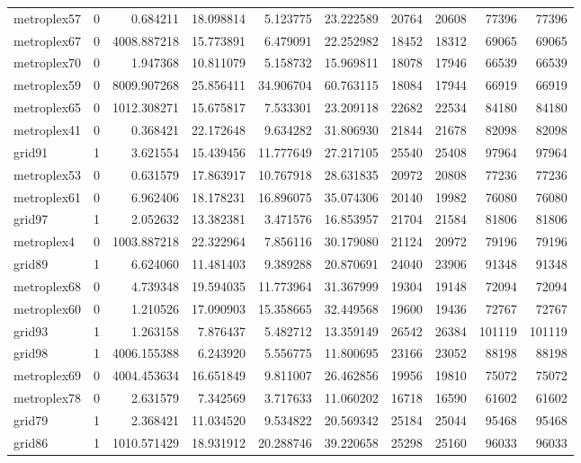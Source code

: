 \begin{longtable}{|l|r|r|r|r|r|r|r|r|r|}
metroplex57 & 0 & 0.684211 & 18.098814 & 5.123775 & 23.222589 & 20764 & 20608 & 77396 & 77396 \\
metroplex67 & 0 & 4008.887218 & 15.773891 & 6.479091 & 22.252982 & 18452 & 18312 & 69065 & 69065 \\
metroplex70 & 0 & 1.947368 & 10.811079 & 5.158732 & 15.969811 & 18078 & 17946 & 66539 & 66539 \\
metroplex59 & 0 & 8009.907268 & 25.856411 & 34.906704 & 60.763115 & 18084 & 17944 & 66919 & 66919 \\
metroplex65 & 0 & 1012.308271 & 15.675817 & 7.533301 & 23.209118 & 22682 & 22534 & 84180 & 84180 \\
metroplex41 & 0 & 0.368421 & 22.172648 & 9.634282 & 31.806930 & 21844 & 21678 & 82098 & 82098 \\
grid91 & 1 & 3.621554 & 15.439456 & 11.777649 & 27.217105 & 25540 & 25408 & 97964 & 97964 \\
metroplex53 & 0 & 0.631579 & 17.863917 & 10.767918 & 28.631835 & 20972 & 20808 & 77236 & 77236 \\
metroplex61 & 0 & 6.962406 & 18.178231 & 16.896075 & 35.074306 & 20140 & 19982 & 76080 & 76080 \\
grid97 & 1 & 2.052632 & 13.382381 & 3.471576 & 16.853957 & 21704 & 21584 & 81806 & 81806 \\
metroplex4 & 0 & 1003.887218 & 22.322964 & 7.856116 & 30.179080 & 21124 & 20972 & 79196 & 79196 \\
grid89 & 1 & 6.624060 & 11.481403 & 9.389288 & 20.870691 & 24040 & 23906 & 91348 & 91348 \\
metroplex68 & 0 & 4.739348 & 19.594035 & 11.773964 & 31.367999 & 19304 & 19148 & 72094 & 72094 \\
metroplex60 & 0 & 1.210526 & 17.090903 & 15.358665 & 32.449568 & 19600 & 19436 & 72767 & 72767 \\
grid93 & 1 & 1.263158 & 7.876437 & 5.482712 & 13.359149 & 26542 & 26384 & 101119 & 101119 \\
grid98 & 1 & 4006.155388 & 6.243920 & 5.556775 & 11.800695 & 23166 & 23052 & 88198 & 88198 \\
metroplex69 & 0 & 4004.453634 & 16.651849 & 9.811007 & 26.462856 & 19956 & 19810 & 75072 & 75072 \\
metroplex78 & 0 & 2.631579 & 7.342569 & 3.717633 & 11.060202 & 16718 & 16590 & 61602 & 61602 \\
grid79 & 1 & 2.368421 & 11.034520 & 9.534822 & 20.569342 & 25184 & 25044 & 95468 & 95468 \\
grid86 & 1 & 1010.571429 & 18.931912 & 20.288746 & 39.220658 & 25298 & 25160 & 96033 & 96033 \\

\end{longtable}
